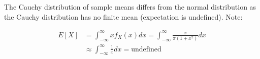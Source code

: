 \documentclass[11pt,a4paper,margin=1in]{article}
\begin{document}
    \noindent The Cauchy distribution of sample means differs from the normal distribution as 
    the Cauchy distribution has no finite mean (expectation is undefined). Note:

    \begin{align*}
        E[X] &= \int_{-\infty}^{\infty} x f_X(x) dx = \int_{-\infty}^{\infty} \frac{x}{\pi(1 + x^2)} dx \\
        &\approx \int_{-\infty}^{\infty} \frac{1}{x} dx = \text{undefined}
    \end{align*}
\end{document}
